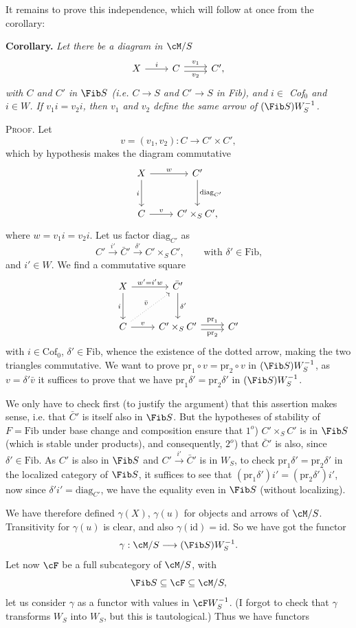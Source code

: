 It remains to prove this independence,
which will follow at once from the corollary:

\textbf{Corollary.} \textit{Let there be a diagram in $\cM/S$}
\[
\begin{tikzcd}
X \arrow[r, "i"] & C \arrow[r, shift left, "v_1"] \arrow[r, shift right, "v_2"'] & C',
\end{tikzcd}
\]
\textit{with $C$ and $C'$ in $\Fib S$ (i.e. $C\longrightarrow S$ and $C'\longrightarrow S$ in Fib), and $i\in$ Cof$_0$ and $i\in W$. If
$v_1i=v_2i$, then $v_1$ and $v_2$ define the same arrow of $(\Fib S)W_S^{-1}$.}

\textsc{Proof}. Let
\[
v=(v_1,v_2):C\longrightarrow C'\times C',
\]
 which by hypothesis makes the diagram commutative
\[
\begin{tikzcd}[row sep=large]
X \arrow[r, "w"] \arrow[d, "i"'] & C' \arrow[d, "\mathrm{diag}_{C'}"] \\
C \arrow[r, "v"] & C'\times_S C',
\end{tikzcd}
\]
where $w=v_1i=v_2i$. Let us factor $\mathrm{diag}_{C'}$ as
\[
C'\xrightarrow{\ i'\ }\bar{C}'\xrightarrow{\ \delta'\ }C'\times_S C', \qquad \text{with $\delta'\in\mathrm{Fib}$,}
\]
and $i'\in W$. We find a commutative square
\[
\begin{tikzcd}[row sep=large]
X \arrow[r, "w'=i'w"] \arrow[d, "i"'] & \bar{C}' \arrow[d, "\delta'"] & \\
C \arrow[r, "v"] \arrow[ur, dotted, "\bar{v}"] & C'\times_S C' \arrow[r, shift left, "\mathrm{pr}_1"] \arrow[r, shift right, "\mathrm{pr}_2"'] & C'
\end{tikzcd}
\]
with $i\in\mathrm{Cof}_0$, $\delta'\in\mathrm{Fib}$, whence the existence of the dotted arrow, making the two triangles
commutative. We want to prove $\mathrm{pr}_1\circ v=\mathrm{pr}_2\circ v$ in $(\Fib S)W_S^{-1}$, as $v=\delta'\bar{v}$ it suffices
to prove that we have $\mathrm{pr}_1\delta'=\mathrm{pr}_2\delta'$ in $(\Fib S)W_S^{-1}$.

We only have to check first (to justify the argument) that this assertion makes sense,
i.e. that $\bar{C}'$ is itself also in $\Fib S$. But the hypotheses of stability of $F=\mathrm{Fib}$ under
base change and composition ensure that $1^o$) $C'\times_S C'$ is in $\Fib S$ (which is
stable under products), and consequently, $2^o$) that $\bar{C}'$ is also, since $\delta'\in\mathrm{Fib}$. As $C'$ is
also in $\Fib S$ and $C'\xrightarrow{\ i'\ }\bar{C}'$ is in $W_S$, to check $\mathrm{pr}_1\delta'=\mathrm{pr}_2\delta'$ in the localized category of
$\Fib S$, it suffices to see that $(\mathrm{pr}_1\delta')i'=(\mathrm{pr}_2\delta')i'$, now since $\delta'i'=\mathrm{diag}_{C'}$, we have the equality even
in $\Fib S$ (without localizing).

We have therefore defined $\gamma(X)$, $\gamma(u)$ for objects and arrows of $\cM/S$. Transitivity for $\gamma(u)$ is
clear, and also $\gamma(\mathrm{id})=\mathrm{id}$. So we have got the functor
\[
\gamma:\cM/S\longrightarrow(\Fib S)W_S^{-1}.
\]
Let now $\cF$ be a full subcategory of $\cM/S$, with
\[
\Fib S\subseteq\cF\subseteq\cM/S,
\]
let us consider $\gamma$ as a functor with values in $\cF W_S^{-1}$. (I forgot to check that $\gamma$ transforms
$W_S$ into $W_S$, but this is tautological.) Thus we have functors
